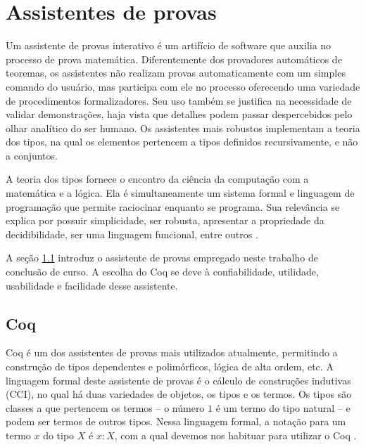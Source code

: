 \chapter{Assistentes de provas}
\label{cap:provas}

Um assistente de provas interativo é um artifício de software que auxilia no processo de prova matemática. Diferentemente dos provadores automáticos de teoremas, os assistentes não realizam provas automaticamente com um simples comando do usuário, mas participa com ele no processo oferecendo uma variedade de procedimentos formalizadores. Seu uso também se justifica na necessidade de validar demonstrações, haja vista que detalhes podem passar despercebidos pelo olhar analítico do ser humano. Os assistentes mais robustos implementam a teoria dos tipos, na qual os elementos pertencem a tipos definidos recursivamente, e não a conjuntos.

A teoria dos tipos fornece o encontro da ciência da computação com a matemática e a lógica. Ela é simultaneamente um sistema formal e linguagem de programação que permite raciocinar enquanto se programa. Sua relevância se explica por possuir simplicidade, ser robusta, apresentar a propriedade da decidibilidade, ser uma linguagem funcional, entre outros \cite{luo}.

A seção \ref{sec:coq} introduz o assistente de provas empregado neste trabalho de conclusão de curso. A escolha do Coq se deve à confiabilidade, utilidade, usabilidade e facilidade desse assistente.

\section{Coq}
\label{sec:coq}

Coq é um dos assistentes de provas mais utilizados atualmente, permitindo a construção de tipos dependentes e polimórficos, lógica de alta ordem, etc. A linguagem formal deste assistente de provas é o cálculo de construções indutivas (\acs{CCI}), no qual há duas variedades de objetos, os tipos e os termos. Os tipos são classes a que pertencem os termos -- o número $1$ é um termo do tipo natural -- e podem ser termos de outros tipos. Nessa linguagem formal, a notação para um termo $x$ do tipo $X$ é $x:X$, com a qual devemos nos habituar para utilizar o Coq \cite{manualcoq}.

